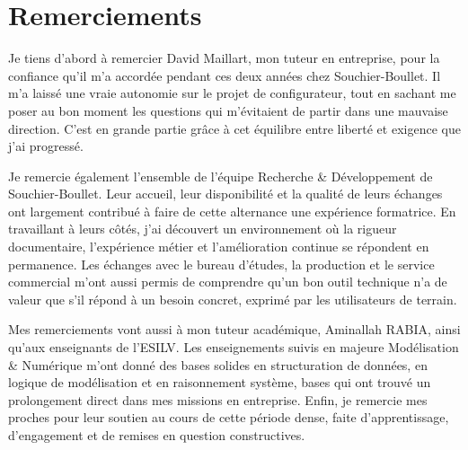 \chapter*{Remerciements}

Je tiens d'abord à remercier David Maillart, mon tuteur en entreprise, pour la confiance qu'il m'a accordée pendant ces deux années chez Souchier-Boullet. Il m'a laissé une vraie autonomie sur le projet de configurateur, tout en sachant me poser au bon moment les questions qui m'évitaient de partir dans une mauvaise direction. C'est en grande partie grâce à cet équilibre entre liberté et exigence que j'ai progressé.

Je remercie également l'ensemble de l'équipe Recherche \& Développement de Souchier-Boullet. Leur accueil, leur disponibilité et la qualité de leurs échanges ont largement contribué à faire de cette alternance une expérience formatrice. En travaillant à leurs côtés, j'ai découvert un environnement où la rigueur documentaire, l'expérience métier et l'amélioration continue se répondent en permanence. Les échanges avec le bureau d'études, la production et le service commercial m'ont aussi permis de comprendre qu'un bon outil technique n'a de valeur que s'il répond à un besoin concret, exprimé par les utilisateurs de terrain.

Mes remerciements vont aussi à mon tuteur académique, Aminallah RABIA, ainsi qu'aux enseignants de l'ESILV. Les enseignements suivis en majeure Modélisation \& Numérique m'ont donné des bases solides en structuration de données, en logique de modélisation et en raisonnement système, bases qui ont trouvé un prolongement direct dans mes missions en entreprise. Enfin, je remercie mes proches pour leur soutien au cours de cette période dense, faite d'apprentissage, d'engagement et de remises en question constructives.
